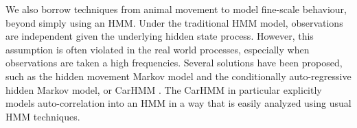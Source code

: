 %


We also borrow techniques from animal movement to model fine-scale behaviour, beyond simply using an HMM.  
Under the traditional HMM model,  observations are independent given  the underlying hidden state process.
However, this assumption is often violated in the real world processes, especially when observations are taken a high frequencies. 
Several solutions have been proposed, such as  the hidden movement Markov model \citep{Whoriskey:2016} and the conditionally auto-regressive hidden Markov model, or CarHMM \citep{Lawler:2019}. 
The CarHMM in particular explicitly models auto-correlation into an HMM in a way that is easily analyzed using usual HMM techniques.

